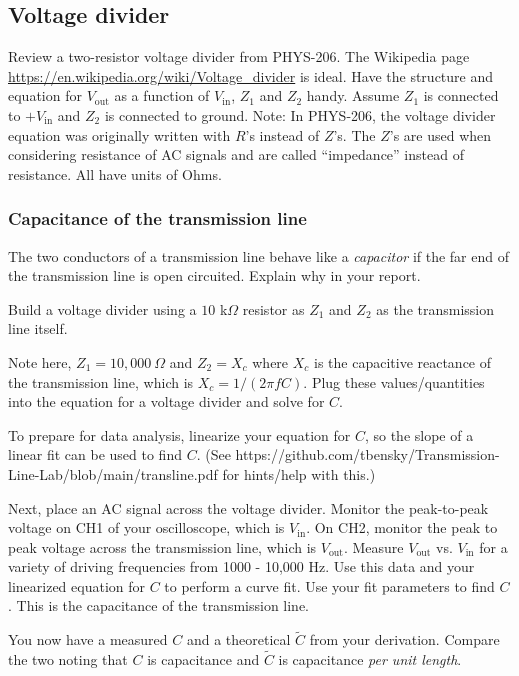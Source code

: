 \documentclass[12pt]{article}
\begin{document}
\subsection{Voltage divider}

Review a two-resistor voltage divider from PHYS-206. The Wikipedia page \url{https://en.wikipedia.org/wiki/Voltage_divider} is ideal. Have the structure and equation for $V_\text{out}$ as a function of $V_\text{in}$, $Z_1$ and $Z_2$ handy. Assume $Z_1$ is connected to $+V_\text{in}$ and $Z_2$ is connected to ground. Note: In PHYS-206, the voltage divider equation was originally written with $R$'s instead of $Z$'s. The $Z$'s are used when considering resistance of AC signals and are called ``impedance'' instead of resistance.  All have units of Ohms.

\subsubsection{Capacitance of the transmission line}

The two conductors of a transmission line behave like a {\sl capacitor} if the far end of the transmission line is open circuited.  Explain why in your report.

Build a voltage divider using a $10$ k$\Omega$ resistor as $Z_1$ and $Z_2$ as the transmission line itself.

Note here, $Z_1=10,000\ \Omega$ and $Z_2=X_c$ where $X_c$ is the capacitive reactance of the transmission line, which is $X_c=1/(2\pi fC)$. Plug these values/quantities into the equation for a voltage divider and solve for $C$. 

To prepare for data analysis, linearize your equation for $C$, so the slope of a linear fit can be used to find $C$. (See https://github.com/tbensky/Transmission-Line-Lab/blob/main/transline.pdf for hints/help with this.)

Next, place an AC signal across the voltage divider. Monitor the peak-to-peak voltage on CH1 of your oscilloscope, which is $V_\text{in}$. On CH2, monitor the peak to peak voltage across the transmission line, which is $V_\text{out}$. Measure $V_\text{out}$ vs. $V_\text{in}$ for a variety of driving frequencies from 1000 - 10,000 Hz. Use this data and your linearized equation for $C$ to perform a curve fit. Use your fit parameters to find $C$. This is the capacitance of the transmission line.


You now have a measured $C$ and a theoretical ${\tilde C}$ from your derivation. Compare the two noting that $C$ is capacitance and ${\tilde C}$ is capacitance \emph{per unit length}.
\end{document}
